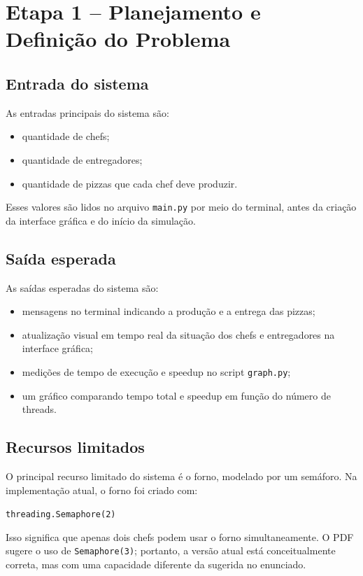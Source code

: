 \documentclass[12pt,a4paper]{article}
\begin{document}
\section{Etapa 1 -- Planejamento e Defini\c{c}\~ao do Problema}

\subsection{Entrada do sistema}
As entradas principais do sistema s\~ao:
\begin{itemize}
    \item quantidade de chefs;
    \item quantidade de entregadores;
    \item quantidade de pizzas que cada chef deve produzir.
\end{itemize}

Esses valores s\~ao lidos no arquivo \texttt{main.py} por meio do terminal, antes da cria\c{c}\~ao da interface gr\'afica e do in\'icio da simula\c{c}\~ao.

\subsection{Sa\'ida esperada}
As sa\'idas esperadas do sistema s\~ao:
\begin{itemize}
    \item mensagens no terminal indicando a produ\c{c}\~ao e a entrega das pizzas;
    \item atualiza\c{c}\~ao visual em tempo real da situa\c{c}\~ao dos chefs e entregadores na interface gr\'afica;
    \item medi\c{c}\~oes de tempo de execu\c{c}\~ao e speedup no script \texttt{graph.py};
    \item um gr\'afico comparando tempo total e speedup em fun\c{c}\~ao do n\'umero de threads.
\end{itemize}

\subsection{Recursos limitados}
O principal recurso limitado do sistema \'e o forno, modelado por um sem\'aforo. Na implementa\c{c}\~ao atual, o forno foi criado com:
\begin{center}
\texttt{threading.Semaphore(2)}
\end{center}
Isso significa que apenas dois chefs podem usar o forno simultaneamente. O PDF sugere o uso de \texttt{Semaphore(3)}; portanto, a vers\~ao atual est\'a conceitualmente correta, mas com uma capacidade diferente da sugerida no enunciado.
\end{document}
